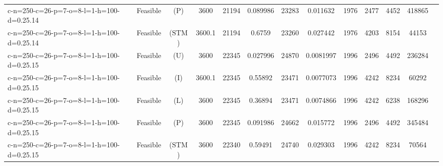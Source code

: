 \documentclass[landscape, a4paper]{article}
\newcommand{\STM}{\ensuremath{\mathrm{STM}}}
\newcommand{\Improved}{\ensuremath{\mathrm{I}}}
\newcommand{\Loose}{\ensuremath{\mathrm{L}}}
\newcommand{\Profit}{\ensuremath{\mathrm{P}}}
\newcommand{\Utility}{\ensuremath{\mathrm{U}}}
\begin{document}
\begin{center}
\begin{tabular}{lcccccccccccc}
c-n=250-c=26-p=7-o=8-l=1-h=100-d=0.25.14 & Feasible & (\Profit) & 3600 & 21194 & 0.089986 & 23283 & 0.011632 & 1976 & 2477 & 4452 & 418865 & \\
c-n=250-c=26-p=7-o=8-l=1-h=100-d=0.25.14 & Feasible & (\STM) & 3600.1 & 21194 & 0.6759 & 23260 & 0.027442 & 1976 & 4203 & 8154 & 44153 & \\
c-n=250-c=26-p=7-o=8-l=1-h=100-d=0.25.15 & Feasible & (\Utility) & 3600 & 22345 & 0.027996 & 24870 & 0.0081997 & 1996 & 2496 & 4492 & 236284 & \\
c-n=250-c=26-p=7-o=8-l=1-h=100-d=0.25.15 & Feasible & (\Improved) & 3600.1 & 22345 & 0.55892 & 23471 & 0.0077073 & 1996 & 4242 & 8234 & 60292 & \\
c-n=250-c=26-p=7-o=8-l=1-h=100-d=0.25.15 & Feasible & (\Loose) & 3600 & 22345 & 0.36894 & 23471 & 0.0074866 & 1996 & 4242 & 6238 & 168296 & \\
c-n=250-c=26-p=7-o=8-l=1-h=100-d=0.25.15 & Feasible & (\Profit) & 3600 & 22345 & 0.091986 & 24662 & 0.015772 & 1996 & 2496 & 4492 & 345484 & \\
c-n=250-c=26-p=7-o=8-l=1-h=100-d=0.25.15 & Feasible & (\STM) & 3600 & 22340 & 0.59491 & 24740 & 0.029303 & 1996 & 4242 & 8234 & 70564 & \\
\end{tabular}
\end{center}
\end{document}
